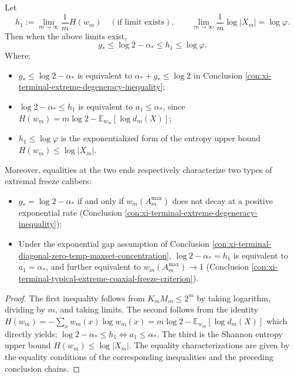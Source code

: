 \begin{conclusion}[Four-quantity chain rigidity: \texorpdfstring{$g_\ast\le \log2-\alpha_\ast\le h_1\le \log\varphi$}{g*<=log2-alpha*<=h1<=logphi} and its freeze phase meaning]\label{con:xi-terminal-four-quantity-chain-rigidity}
Let
\[
h_1:=\lim_{m\to\infty}\frac{1}{m}H(w_m)
\quad(\text{if limit exists}),\qquad
\lim_{m\to\infty}\frac{1}{m}\log|X_m|=\log\varphi.
\]
Then when the above limits exist,
\[
g_\ast\le \log2-\alpha_\ast\le h_1\le \log\varphi.
\]
Where:
\begin{itemize}
  \item \(g_\ast\le \log2-\alpha_\ast\) is equivalent to \(\alpha_\ast+g_\ast\le\log2\) in Conclusion \ref{con:xi-terminal-extreme-degeneracy-inequality};
  \item \(\log2-\alpha_\ast\le h_1\) is equivalent to \(a_1\le \alpha_\ast\), since
  \(
  H(w_m)=m\log2-\mathbb E_{w_m}[\log d_m(X)]
  \);
  \item \(h_1\le \log\varphi\) is the exponentialized form of the entropy upper bound \(H(w_m)\le \log|X_m|\).
\end{itemize}
Moreover, equalities at the two ends respectively characterize two types of extremal freeze calibers:
\begin{itemize}
  \item \(g_\ast=\log2-\alpha_\ast\) if and only if \(w_m(A_m^{\max})\) does not decay at a positive exponential rate (Conclusion \ref{con:xi-terminal-extreme-degeneracy-inequality});
  \item Under the exponential gap assumption of Conclusion \ref{con:xi-terminal-diagonal-zero-temp-maxset-concentration},
  \(\log2-\alpha_\ast=h_1\) is equivalent to \(a_1=\alpha_\ast\), and further equivalent to \(w_m(A_m^{\max})\to 1\) (Conclusion \ref{con:xi-terminal-typical-extreme-coaxial-freeze-criterion}).
\end{itemize}
\end{conclusion}
\begin{proof}
The first inequality follows from \(K_mM_m\le 2^m\) by taking logarithm, dividing by \(m\), and taking limits.
The second follows from the identity
\(
H(w_m)=-\sum_x w_m(x)\log w_m(x)
=m\log2-\mathbb E_{w_m}[\log d_m(X)]
\)
which directly yields: \(\log2-\alpha_\ast\le h_1\iff a_1\le\alpha_\ast\).
The third is the Shannon entropy upper bound \(H(w_m)\le \log|X_m|\).
The equality characterizations are given by the equality conditions of the corresponding inequalities and the preceding conclusion chains.
\end{proof}
